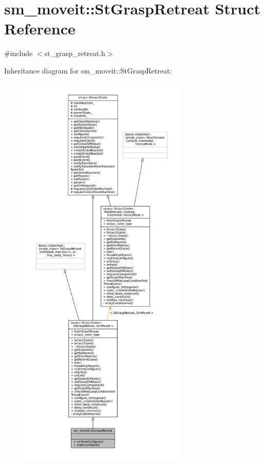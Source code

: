 \hypertarget{structsm__moveit_1_1StGraspRetreat}{}\section{sm\+\_\+moveit\+:\+:St\+Grasp\+Retreat Struct Reference}
\label{structsm__moveit_1_1StGraspRetreat}


{\ttfamily \#include $<$st\+\_\+grasp\+\_\+retreat.\+h$>$}



Inheritance diagram for sm\+\_\+moveit\+:\+:St\+Grasp\+Retreat\+:
\nopagebreak
\begin{figure}[H]
\begin{center}
\leavevmode
\includegraphics[height=550pt]{structsm__moveit_1_1StGraspRetreat__inherit__graph}
\end{center}
\end{figure}


